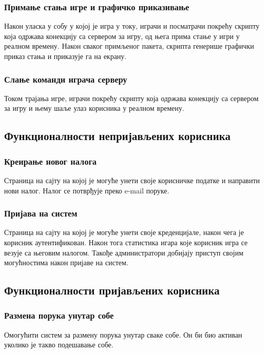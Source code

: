 \subsubsection{Примање стања игре и графичко приказивање}
Након уласка у собу у којој је игра у току, играчи и посматрачи покрећу скрипту која одржава конекцију са сервером
за игру, од њега прима стање у игри у реалном времену. Након сваког примљеног пакета, скрипта генерише графички
приказ стања и приказује га на екрану.

\subsubsection{Слање команди играча серверу}
Током трајања игре, играчи покрећу скрипту која одржава конекцију са сервером за игру и њему шаље улаз корисника
у реалном времену.

\subsection{Функционалности непријављених корисника}

\subsubsection{Креирање новог налога}
Страница на сајту на којој је могуће унети своје корисничке податке и направити нови налог. Налог се потврђује
преко e-mail поруке.

\subsubsection{Пријава на систем}
Страница на сајту на којој је могуће унети своје креденцијале, након чега је корисник аутентификован. Након тога
статистика игара које корисник игра се везује са његовим налогом. Такође администратори добијају приступ својим
могућностима након пријаве на систем.

\subsection{Функционалности пријављених корисника}

\subsubsection{Размена порука унутар собе}
Омогућити систем за размену порука унутар сваке собе. Он би био активан уколико је такво подешавање собе.

